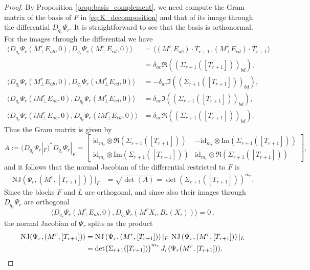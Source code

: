 \documentclass{article}
\theoremstyle{definition}
\newcommand{\id}{\mathrm{id}}
\newcommand{\NJ}{\mathrm{NJ}}
\begin{document}
\begin{proof}
By Proposition \ref{prop:basis_complement}, we need compute the Gram matrix of the basis of $F$ in \eqref{eq:K_decomposition} and that of its image through the differential $D_{q_r}\Psi_r$. It is straightforward to see that the basis is orthonormal. For the images through the differential we have
\begin{align*}
    \langle D_{q_r}\Psi_r(M^r_{\perp}E_{ab}, 0), D_{q_r}\Psi_r(M^r_{\perp}E_{cd}, 0) \rangle 
&= \langle (M^r_{\perp}E_{ab})\cdot T_{r+1}, (M^r_{\perp}E_{cd})\cdot T_{r+1} \rangle \\
&=\delta_{ac}\Re((\Sigma_{r+1}([T_{r+1}]))_{bd}), \\[4pt]
%
\langle D_{q_r}\Psi_r(M^r_{\perp}E_{ab}, 0), D_{q_r}\Psi_r(iM^r_{\perp}E_{cd}, 0) \rangle 
&= -\delta_{ac}\Im((\Sigma_{r+1}([T_{r+1}]))_{bd}), \\[4pt]
%
\langle D_{q_r}\Psi_r(iM^r_{\perp}E_{ab}, 0), D_{q_r}\Psi_r(M^r_{\perp}E_{cd}, 0) \rangle 
&= \delta_{ac}\Im((\Sigma_{r+1}([T_{r+1}]))_{bd}), \\[4pt]
%
\langle D_{q_r}\Psi_r(iM^r_{\perp}E_{ab}, 0), D_{q_r}\Psi_r(iM^r_{\perp}E_{cd}, 0) \rangle 
&= \delta_{ac}\Re((\Sigma_{r+1}([T_{r+1}]))_{bd}).
\end{align*}
Thus the Gram matrix is given by 
\begin{equation*}A := (D_{q_r}\Psi_r|_F)^*D_{q_r}\Psi_r|_F =
\begin{bmatrix}
        \id_{m_r} \otimes \Re(\Sigma_{r+1}([T_{r+1}])) & -\id_{m_r} \otimes \text{Im}(\Sigma_{r+1}([T_{r+1}])) \\
        \id_{m_r} \otimes \text{Im}(\Sigma_{r+1}([T_{r+1}])) & \id_{m_r} \otimes \Re(\Sigma_{r+1}([T_{r+1}]))
    \end{bmatrix} ,
\end{equation*}
and it follows that the normal Jacobian of the differential restricted to $F$ is 
\begin{align*}
    \NJ\left(\Psi_r, (M^r, [T_{r+1}])\right)|_F &= \sqrt{\det(A)} =\det(\Sigma_{r+1}([T_{r+1}]))^{m_r}.
\end{align*}
Since the blocks $F$ and $L$ are orthogonal, and since also their images through $D_{q_r}\Psi_r$ are orthogonal
\begin{equation*}
    \langle D_{q_r}\Psi_r(M^r_{\perp}E_{ab}, 0), D_{q_r}\Psi_r(M^rX_i, B_r(X_i)) \rangle 
= 0\, ,
\end{equation*}
the normal Jacobian of $\Psi_r$ splits as the product
\begin{align*}
    \NJ(\Psi_r,(M^r, [T_{r+1}]))
&= \NJ\left(\Psi_r, (M^r, [T_{r+1}])\right)|_F \ \NJ\left(\Psi_r, (M^r, [T_{r+1}])\right)|_L \\
&= \det\bigl(\Sigma_{r+1}([T_{r+1}])\bigr)^{m_r}
\,J_r(\Psi_r(M^r, [T_{r+1}])). \qedhere
\end{align*}
\end{proof}
\end{document}
